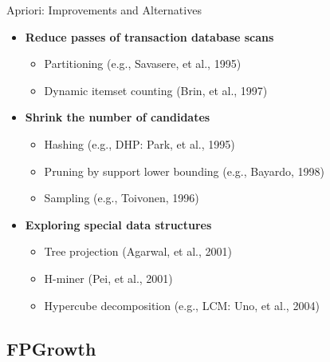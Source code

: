\documentclass[aspectratio=169, 11pt]{beamer}
\begin{document}
\begin{frame}{Apriori: Improvements and Alternatives}
    \begin{itemize}
        \item \textbf{Reduce passes of transaction database scans}
        \begin{itemize}
            \item Partitioning (e.g., Savasere, et al., 1995) %
            \item Dynamic itemset counting (Brin, et al., 1997)
        \end{itemize}
        \item \textbf{Shrink the number of candidates}
        \begin{itemize}
            \item Hashing (e.g., DHP: Park, et al., 1995) %
            \item Pruning by support lower bounding (e.g., Bayardo, 1998)
            \item Sampling (e.g., Toivonen, 1996)
        \end{itemize}
        \item \textbf{Exploring special data structures}
        \begin{itemize}
            \item Tree projection (Agarwal, et al., 2001)
            \item H-miner (Pei, et al., 2001)
            \item Hypercube decomposition (e.g., LCM: Uno, et al., 2004)
        \end{itemize}
    \end{itemize}
\end{frame}

\subsection{FPGrowth}
\end{document}
